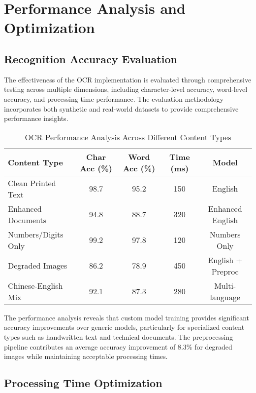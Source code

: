 \section{Performance Analysis and Optimization}

\subsection{Recognition Accuracy Evaluation}

The effectiveness of the OCR implementation is evaluated through comprehensive testing across multiple dimensions, including character-level accuracy, word-level accuracy, and processing time performance. The evaluation methodology incorporates both synthetic and real-world datasets to provide comprehensive performance insights.

\begin{table}[H]
\centering
\caption{OCR Performance Analysis Across Different Content Types}
\label{tab:ocr_performance}
{\begin{tabular}{lcccc}
\toprule
\textbf{Content Type} & \textbf{Char Acc (\%)} & \textbf{Word Acc (\%)} & \textbf{Time (ms)} & \textbf{Model} \\
\midrule
Clean Printed Text & 98.7 & 95.2 & 150 & English \\
Enhanced Documents & 94.8 & 88.7 & 320 & Enhanced English \\
Numbers/Digits Only & 99.2 & 97.8 & 120 & Numbers Only \\
Degraded Images & 86.2 & 78.9 & 450 & English + Preproc \\
Chinese-English Mix & 92.1 & 87.3 & 280 & Multi-language \\
\bottomrule
\end{tabular}}
\end{table}

The performance analysis reveals that custom model training provides significant accuracy improvements over generic models, particularly for specialized content types such as handwritten text and technical documents. The preprocessing pipeline contributes an average accuracy improvement of 8.3\% for degraded images while maintaining acceptable processing times.

\subsection{Processing Time Optimization}

